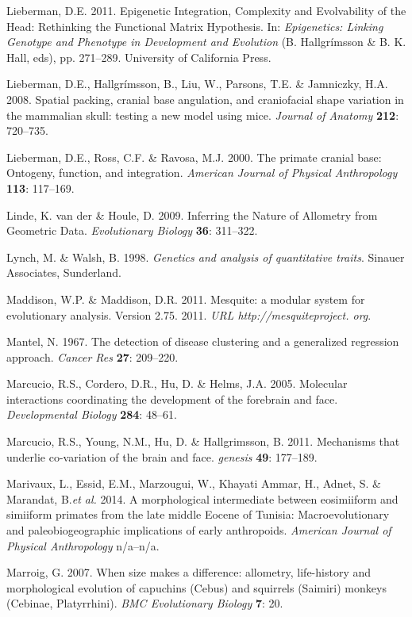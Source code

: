 \documentclass[12pt,twoside]{report}
\begin{document}
Lieberman, D.E. 2011. Epigenetic Integration, Complexity and
Evolvability of the Head: Rethinking the Functional Matrix Hypothesis.
In: \emph{Epigenetics: Linking Genotype and Phenotype in Development and
Evolution} (B. Hallgrímsson \& B. K. Hall, eds), pp. 271--289.
University of California Press.

Lieberman, D.E., Hallgrímsson, B., Liu, W., Parsons, T.E. \& Jamniczky,
H.A. 2008. Spatial packing, cranial base angulation, and craniofacial
shape variation in the mammalian skull: testing a new model using mice.
\emph{Journal of Anatomy} \textbf{212}: 720--735.

Lieberman, D.E., Ross, C.F. \& Ravosa, M.J. 2000. The primate cranial
base: Ontogeny, function, and integration. \emph{American Journal of
Physical Anthropology} \textbf{113}: 117--169.

Linde, K. van der \& Houle, D. 2009. Inferring the Nature of Allometry
from Geometric Data. \emph{Evolutionary Biology} \textbf{36}: 311--322.

Lynch, M. \& Walsh, B. 1998. \emph{Genetics and analysis of quantitative
traits}. Sinauer Associates, Sunderland.

Maddison, W.P. \& Maddison, D.R. 2011. Mesquite: a modular system for
evolutionary analysis. Version 2.75. 2011. \emph{URL
http://mesquiteproject. org}.

Mantel, N. 1967. The detection of disease clustering and a generalized
regression approach. \emph{Cancer Res} \textbf{27}: 209--220.

Marcucio, R.S., Cordero, D.R., Hu, D. \& Helms, J.A. 2005. Molecular
interactions coordinating the development of the forebrain and face.
\emph{Developmental Biology} \textbf{284}: 48--61.

Marcucio, R.S., Young, N.M., Hu, D. \& Hallgrimsson, B. 2011. Mechanisms
that underlie co-variation of the brain and face. \emph{genesis}
\textbf{49}: 177--189.

Marivaux, L., Essid, E.M., Marzougui, W., Khayati Ammar, H., Adnet, S.
\& Marandat, B.\emph{et al.} 2014. A morphological intermediate between
eosimiiform and simiiform primates from the late middle Eocene of
Tunisia: Macroevolutionary and paleobiogeographic implications of early
anthropoids. \emph{American Journal of Physical Anthropology} n/a--n/a.

Marroig, G. 2007. When size makes a difference: allometry, life-history
and morphological evolution of capuchins (Cebus) and squirrels (Saimiri)
monkeys (Cebinae, Platyrrhini). \emph{BMC Evolutionary Biology}
\textbf{7}: 20.
\end{document}
